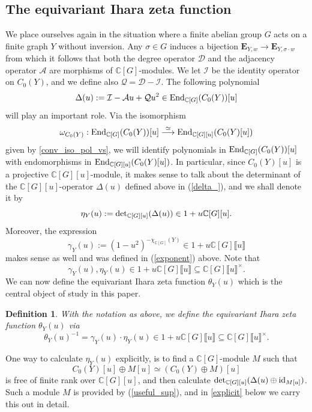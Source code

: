 \documentclass[11pt]{amsart}
\newtheorem{definition}[theorem]{Definition}
\numberwithin{equation}{section}
\theoremstyle{remark}
\theoremstyle{definition}
\begin{document}
\subsection{The equivariant Ihara zeta function} \label{section:theequiv}
We place ourselves again in the situation where a finite abelian group $G$ acts on a finite graph $Y$ without inversion.  Any $\sigma \in G$ induces a bijection $\mathbf{E}_{Y,w} \rightarrow \mathbf{E}_{Y,\sigma \cdot w}$ from which it follows that both the degree operator $\mathcal{D}$ and the adjacency operator $\mathcal{A}$ are morphisms of $\mathbb{C}[G]$-modules.  We let $\mathcal{I}$ be the identity operator on $C_{0}(Y)$, and we define also $\mathcal{Q} = \mathcal{D} - \mathcal{I}$.  The following polynomial
\begin{equation} \label{delta_}
\Delta(u) := \mathcal{I} - \mathcal{A}u + \mathcal{Q}u^{2} \in {\rm End}_{\mathbb{C}[G]}(C_{0}(Y))[u] 
\end{equation}
will play an important role.  Via the isomorphism 
$$\omega_{C_{0}(Y)}:{\rm End}_{\mathbb{C}[G]}(C_{0}(Y))[u] \stackrel{\simeq}{\longrightarrow} {\rm End}_{\mathbb{C}[G][u]}(C_{0}(Y)[u]) $$
given by \cref{conv_iso_pol_vs}, we will identify polynomials in ${\rm End}_{\mathbb{C}[G]}(C_{0}(Y))[u]$ with endomorphisms in ${\rm End}_{\mathbb{C}[G][u]}(C_{0}(Y)[u])$.  In particular, since $C_{0}(Y)[u]$ is a projective $\mathbb{C}[G][u]$-module, it makes sense to talk about the determinant of the $\mathbb{C}[G][u]$-operator $\Delta(u)$ defined above in (\ref{delta_}), and we shall denote it by
$$\eta_{Y}(u) := {\rm det}_{\mathbb{C}[G][u]}(\Delta(u)) \in 1 + u\mathbb{C}[G][u]. $$
Moreover, the expression
$$\gamma_{Y}(u) := (1-u^{2})^{-\chi_{\mathbb{C}[G]}(Y)} \in 1 +u\mathbb{C}[G] \llbracket u \rrbracket  $$
makes sense as well and was defined in (\ref{exponent}) above.  Note that
$$\gamma_{Y}(u), \eta_{Y}(u) \in 1 + u\mathbb{C}[G]\llbracket u \rrbracket \subseteq \mathbb{C}[G]\llbracket u \rrbracket^{\times}.$$
We can now define the equivariant Ihara zeta function $\theta_{Y}(u)$ which is the central object of study in this paper.  
\begin{definition} \label{equiv_ihara}
With the notation as above, we define the equivariant Ihara zeta function $\theta_{Y}(u)$ via
$$\theta_{Y}(u)^{-1} = \gamma_{Y}(u) \cdot \eta_{Y}(u) \in 1 + u\mathbb{C}[G]\llbracket u \rrbracket \subseteq \mathbb{C}[G]\llbracket u \rrbracket^{\times}. $$
\end{definition}
One way to calculate $\eta_{Y}(u)$ explicitly, is to find a $\mathbb{C}[G]$-module $M$ such that
$$C_{0}(Y)[u] \oplus M[u] \simeq (C_{0}(Y) \oplus M)[u] $$
is free of finite rank over $\mathbb{C}[G][u]$, and then calculate ${\rm det}_{\mathbb{C}[G][u]}(\Delta(u) \oplus {\rm id}_{M[u]})$.  Such a module $M$ is provided by (\ref{useful_sup}), and in \cref{explicit} below we carry this out in detail.
\end{document}
